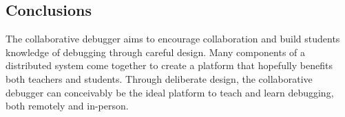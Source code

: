 \documentclass[12pt]{article}
\begin{document}
\subsection{Conclusions}

The collaborative debugger aims to encourage collaboration and build
students knowledge of debugging through careful design.  Many
components of a distributed system come together to create a platform
that hopefully benefits both teachers and students.  Through
deliberate design, the collaborative debugger can conceivably be the
ideal platform to teach and learn debugging, both remotely and
in-person.

\pagebreak

{}
\end{document}
